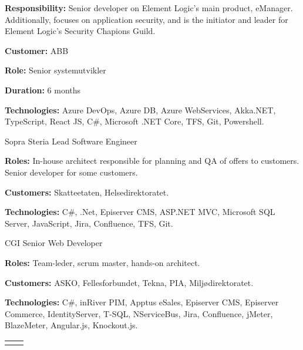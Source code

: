 \documentclass[10pt]{article} %
\begin{document}
\begin{paracol}{2}
{\textbf{Responsibility:} Senior developer on Element Logic's main product, eManager. Additionally,  focuses on application security, and is the initiator and leader for Element Logic's Security Chapions Guild.
 
\textbf{}
 
\textbf{Customer:} ABB

\textbf{Role:} Senior systemutvikler

\textbf{Duration:} 6 months

\textbf{Technologies:} Azure DevOps, Azure DB, Azure WebServices, Akka.NET, TypeScript, React JS, C\#, Microsoft .NET Core, TFS, Git, Powershell.
} 

{}
{Sopra Steria} 
{Lead Software Engineer} 
{\textbf{Roles:} In-house architect responsible for planning and QA of offers to customers. Senior developer for some customers.

\textbf{Customers:} Skatteetaten, Helsedirektoratet.

\textbf{Technologies:} C\#, .Net, Episerver CMS, ASP.NET MVC, Microsoft SQL Server, JavaScript, Jira, Confluence, TFS, Git.
} 

{}
{CGI} 
{Senior Web Developer} 
{\textbf{Roles:} Team-leder, scrum master, hands-on architect.

\textbf{Customers:} ASKO, Fellesforbundet, Tekna, PIA, Miljødirektoratet.

\textbf{Technologies:} C\#, inRiver PIM, Apptus eSales, Episerver CMS, Episerver Commerce, IdentityServer, T-SQL, NServiceBus, Jira, Confluence, jMeter, BlazeMeter, Angular.js, Knockout.js.
} 
 

\begin{supertabular}{rl} %

\end{supertabular}

\vspace{-\baselineskip}\medskip %
\switchcolumn %


\end{paracol}
\end{document}
